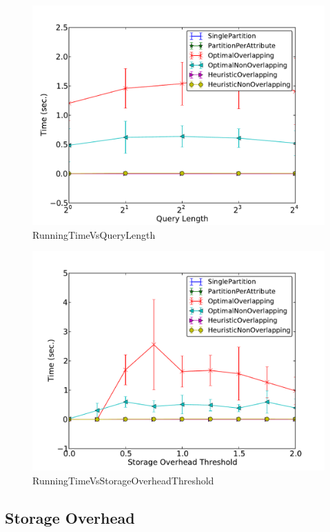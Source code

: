 \begin{figure}[ht]
\centerline{\includegraphics[width=0.9\columnwidth]{figures/RunningTimeVsQueryLength.pdf}}
\caption{RunningTimeVsQueryLength}
\end{figure}

\begin{figure}[ht]
\centerline{\includegraphics[width=0.9\columnwidth]{figures/RunningTimeVsStorageOverheadThreshold.pdf}}
\caption{RunningTimeVsStorageOverheadThreshold}
\end{figure}


\subsection{Storage Overhead}

